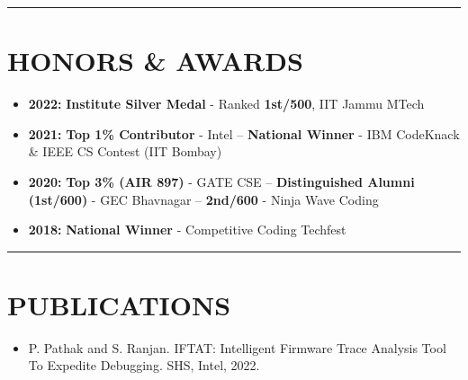 \documentclass[10pt,a4paper]{article}
\begin{document}
\vspace{2pt}
\noindent\rule{\textwidth}{0.8pt}

\section*{HONORS \& AWARDS}

{\small
\begin{itemize}[leftmargin=0.15in, itemsep=1.5pt, topsep=0pt, parsep=0pt, partopsep=0pt, label=$\bullet$]
    \item \textbf{2022:} \textbf{Institute Silver Medal} - Ranked \textbf{1st/500}, IIT Jammu MTech
    \item \textbf{2021:} \textbf{Top 1\% Contributor} - Intel -- \textbf{National Winner} - IBM CodeKnack \& IEEE CS Contest (IIT Bombay)
    \item \textbf{2020:} \textbf{Top 3\% (AIR 897)} - GATE CSE -- \textbf{Distinguished Alumni (1st/600)} - GEC Bhavnagar -- \textbf{2nd/600} - Ninja Wave Coding
    \item \textbf{2018:} \textbf{National Winner} - Competitive Coding Techfest
\end{itemize}
}

\vspace{2pt}
\noindent\rule{\textwidth}{0.8pt}

\section*{PUBLICATIONS}

{\small
\begin{itemize}[leftmargin=0.15in, itemsep=1.5pt, topsep=0pt, parsep=0pt, partopsep=0pt, label=$\bullet$]
    \item P. Pathak and S. Ranjan. IFTAT: Intelligent Firmware Trace Analysis Tool To Expedite Debugging. SHS, Intel, 2022.
\end{itemize}
}
\end{document}
